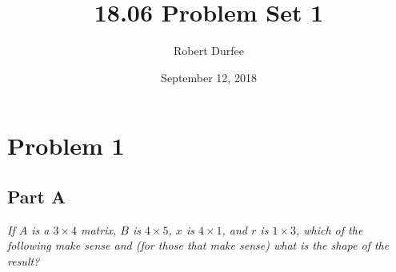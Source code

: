 \documentclass{article}
\title{18.06 Problem Set 1}
\author{Robert Durfee}
\date{September 12, 2018}
\begin{document}
\maketitle

\section*{Problem 1}

\subsection*{Part A}

\textit{If $ A $ is a $ 3 \times 4 $ matrix, $ B $ is $ 4 \times 5 $, $ x $ is $
4 \times 1 $, and $ r $ is $ 1 \times 3 $, which of the following make sense and
(for those that make sense) what is the shape of the result?}
\end{document}
